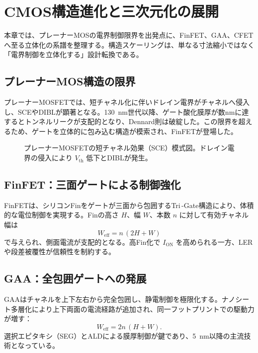 
\section{CMOS構造進化と三次元化の展開}
本章では、プレーナーMOSの電界制御限界を出発点に、FinFET、GAA、CFETへ至る立体化の系譜を整理する。構造スケーリングは、単なる寸法縮小ではなく「電界制御を立体化する」設計転換である。

\subsection{プレーナーMOS構造の限界}
プレーナーMOSFETでは、短チャネル化に伴いドレイン電界がチャネルへ侵入し、SCEやDIBLが顕著となる。\SI{130}{\nano\meter}世代以降、ゲート酸化膜厚が数\si{\nano\meter}に達するとトンネルリークが支配的となり、Dennard則は破綻した。この限界を超えるため、ゲートを立体的に包み込む構造が模索され、FinFETが登場した。

\begin{figure}[!t]
  \centering
  \caption{プレーナーMOSFETの短チャネル効果（SCE）模式図。ドレイン電界の侵入により $V_\mathrm{th}$ 低下とDIBLが発生。}
  \label{fig:planar_sce}
\end{figure}

\subsection{FinFET：三面ゲートによる制御強化}
FinFETは、シリコンFinをゲートが三面から包囲するTri\,$\!$-Gate構造により、体積的な電位制御を実現する。Finの高さ $H$、幅 $W$、本数 $n$ に対して有効チャネル幅は
\begin{equation}
  W_{\mathrm{eff}} = n\,(2H + W)
  \label{eq:weff_finfet}
\end{equation}
で与えられ、側面電流が支配的となる。高Fin化で $I_\mathrm{ON}$ を高められる一方、LERや段差被覆性が信頼性を制約する。

\subsection{GAA：全包囲ゲートへの発展}
GAAはチャネルを上下左右から完全包囲し、静電制御を極限化する。ナノシート多層化により上下両面の電流経路が追加され、同一フットプリントでの駆動力が増す：
\begin{equation}
  W_{\mathrm{eff}} = 2n\,(H + W).
  \label{eq:weff_gaa}
\end{equation}
選択エピタキシ（SEG）とALDによる膜厚制御が鍵であり、\SI{5}{\nano\meter}以降の主流技術となっている。


